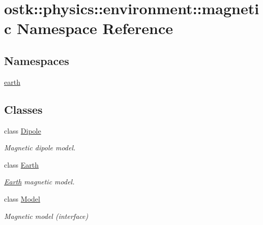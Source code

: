 \hypertarget{namespaceostk_1_1physics_1_1environment_1_1magnetic}{}\section{ostk\+:\+:physics\+:\+:environment\+:\+:magnetic Namespace Reference}
\label{namespaceostk_1_1physics_1_1environment_1_1magnetic}
\subsection*{Namespaces}
\begin{DoxyCompactItemize}
\item 
 \hyperlink{namespaceostk_1_1physics_1_1environment_1_1magnetic_1_1earth}{earth}
\end{DoxyCompactItemize}
\subsection*{Classes}
\begin{DoxyCompactItemize}
\item 
class \hyperlink{classostk_1_1physics_1_1environment_1_1magnetic_1_1_dipole}{Dipole}
\begin{DoxyCompactList}\small\item\em Magnetic dipole model. \end{DoxyCompactList}\item 
class \hyperlink{classostk_1_1physics_1_1environment_1_1magnetic_1_1_earth}{Earth}
\begin{DoxyCompactList}\small\item\em \hyperlink{classostk_1_1physics_1_1environment_1_1magnetic_1_1_earth}{Earth} magnetic model. \end{DoxyCompactList}\item 
class \hyperlink{classostk_1_1physics_1_1environment_1_1magnetic_1_1_model}{Model}
\begin{DoxyCompactList}\small\item\em Magnetic model (interface) \end{DoxyCompactList}\end{DoxyCompactItemize}
